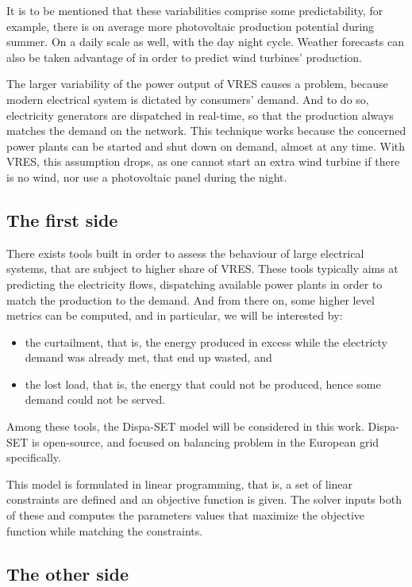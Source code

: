 It is to be mentioned that these variabilities comprise some predictability, for example, there is on average more photovoltaic production potential during summer. On a daily scale as well, with the day night cycle. Weather forecasts can also be taken advantage of in order to predict wind turbines' production.

The larger variability of the power output of VRES causes a problem, because modern electrical system is dictated by consumers' demand. And to do so, electricity generators are dispatched in real-time, so that the production always matches the demand on the network. This technique works because the concerned power plants can be started and shut down on demand, almost at any time. With VRES, this assumption drops, as one cannot start an extra wind turbine if there is no wind, nor use a photovoltaic panel during the night.

\subsection{The first side}

There exists tools built in order to assess the behaviour of large electrical systems, that are subject to higher share of VRES. These tools typically aims at predicting the electricity flows, dispatching available power plants in order to match the production to the demand. And from there on, some higher level metrics can be computed, and in particular, we will be interested by:
\begin{itemize}
    \item the curtailment, that is, the energy produced in excess while the electricty demand was already met, that end up wasted, and
    \item the lost load, that is, the energy that could not be produced, hence some demand could not be served.
\end{itemize}

Among these tools, the Dispa-SET model will be considered in this work. Dispa-SET is open-source, and focused on balancing problem in the European grid specifically.

This model is formulated in linear programming, that is, a set of linear constraints are defined and an objective function is given. The solver inputs both of these and computes the parameters values that maximize the objective function while matching the constraints.

\subsection{The other side}

